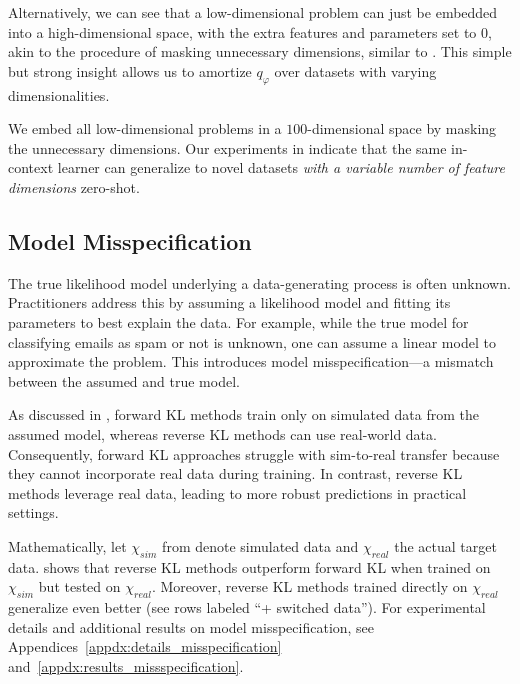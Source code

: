 Alternatively, we can see that a low-dimensional problem can just be embedded into a high-dimensional space, with the extra features and parameters set to $0$, akin to the procedure of masking unnecessary dimensions, similar to \cite{hollmann2022tabpfn}. This simple but strong insight allows us to amortize $q_\varphi$ over datasets with varying dimensionalities.

We embed all low-dimensional problems in a $100$-dimensional space by masking the unnecessary dimensions. Our experiments in  indicate that the same in-context learner can generalize to novel datasets \textit{with a variable number of feature dimensions} zero-shot.

\vspace{-3mm}
\subsection{Model Misspecification}
\vspace{-1mm}
\label{subsec:misspecification}
The true likelihood model underlying a data-generating process is often unknown. Practitioners address this by assuming a likelihood model and fitting its parameters to best explain the data. For example, while the true model for classifying emails as spam or not is unknown, one can assume a linear model to approximate the problem. This introduces model misspecification—a mismatch between the assumed and true model.

As discussed in , forward KL methods train only on simulated data from the assumed model, whereas reverse KL methods can use real-world data. Consequently, forward KL approaches struggle with sim-to-real transfer because they cannot incorporate real data during training. In contrast, reverse KL methods leverage real data, leading to more robust predictions in practical settings.

\begin{table}

\end{table}
Mathematically, let $\chi_{sim}$ from  denote simulated data and $\chi_{real}$ the actual target data.  shows that reverse KL methods outperform forward KL when trained on $\chi_{sim}$ but tested on $\chi_{real}$. Moreover, reverse KL methods trained directly on $\chi_{real}$ generalize even better (see rows labeled “+ switched data”).
For experimental details and additional results on model misspecification, see Appendices~\ref{appdx:details_misspecification} and~\ref{appdx:results_missspecification}.

